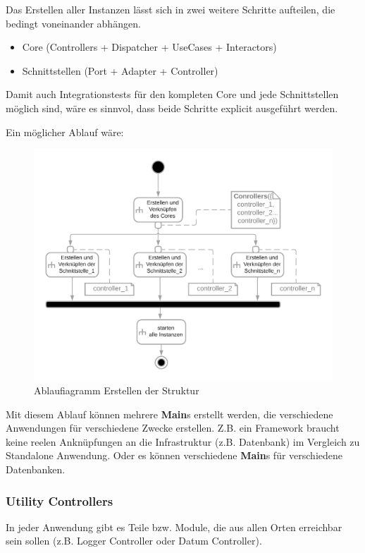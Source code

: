 \documentclass{article}
\begin{document}
    Das Erstellen aller Instanzen lässt sich in zwei weitere Schritte aufteilen, die bedingt voneinander abhängen.
    \begin{itemize}
        \item Core (Controllers + Dispatcher + UseCases + Interactors)
        \item Schnittstellen (Port + Adapter + Controller)
    \end{itemize}

    Damit auch Integrationstests für den kompleten Core und jede Schnittstellen möglich sind, wäre es sinnvol, dass beide Schritte
    explicit ausgeführt werden.

    Ein möglicher Ablauf wäre:
    \begin{figure}[H]
        \centering
        \includegraphics[width=12cm]{./images/Erstellen AD.png}
         \caption[Ablaufiagramm Erstellen der Struktur]{Ablaufiagramm Erstellen der Struktur \footnotemark}
         \label{fig:ADCreate}
    \end{figure}


    Mit diesem Ablauf können mehrere \textbf{Main}s erstellt werden, die verschiedene Anwendungen für verschiedene Zwecke erstellen.
    Z.B. ein Framework braucht keine reelen Anknüpfungen an die Infrastruktur (z.B. Datenbank) im Vergleich zu Standalone Anwendung.
    Oder es können verschiedene \textbf{Main}s für verschiedene Datenbanken.


    \subsubsection{Utility Controllers}
    In jeder Anwendung gibt es Teile bzw. Module, die aus allen Orten erreichbar sein sollen
    (z.B. Logger Controller oder Datum Controller).
    
\end{document}
